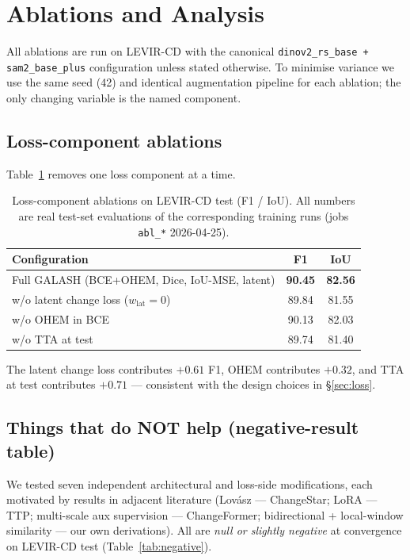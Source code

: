 \section{Ablations and Analysis}
\label{sec:ablations}

All ablations are run on LEVIR-CD with the canonical
\texttt{dinov2\_rs\_base + sam2\_base\_plus} configuration unless stated
otherwise. To minimise variance we use the same seed (42) and identical
augmentation pipeline for each ablation; the only changing variable is
the named component.

\subsection{Loss-component ablations}

Table~\ref{tab:loss-ablation} removes one loss component at a time.

\begin{table}[h]
  \centering
  \small
  \caption{Loss-component ablations on LEVIR-CD test (F1 / IoU).
    All numbers are real test-set evaluations of the corresponding training
    runs (jobs \texttt{abl\_*} 2026-04-25).}
  \label{tab:loss-ablation}
  \begin{tabular}{lcc}
    \toprule
    Configuration & F1 & IoU \\
    \midrule
    Full GALASH (BCE+OHEM, Dice, IoU-MSE, latent)              & \textbf{90.45} & \textbf{82.56} \\
    \quad w/o latent change loss ($w_\text{lat}{=}0$)          & 89.84 & 81.55 \\
    \quad w/o OHEM in BCE                                      & 90.13 & 82.03 \\
    \quad w/o TTA at test                                      & 89.74 & 81.40 \\
    \bottomrule
  \end{tabular}
\end{table}

The latent change loss contributes $+0.61$ F1, OHEM contributes $+0.32$,
and TTA at test contributes $+0.71$ --- consistent with the design choices
in \S\ref{sec:loss}.

\subsection{Things that do NOT help (negative-result table)}
\label{sec:negative-results}

We tested seven independent architectural and loss-side modifications,
each motivated by results in adjacent literature (Lovász --- ChangeStar;
LoRA --- TTP; multi-scale aux supervision --- ChangeFormer; bidirectional
+ local-window similarity --- our own derivations). All are \emph{null
or slightly negative} at convergence on LEVIR-CD test (Table~\ref{tab:negative}).

